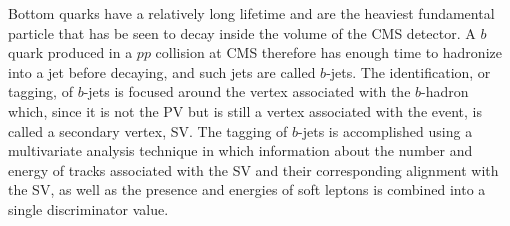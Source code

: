  Bottom quarks have a relatively long lifetime 
  and are the heaviest fundamental particle
  that has be seen to decay inside the volume of the CMS detector.
 A $b$ quark produced in a $pp$ collision at CMS 
  therefore has enough time to hadronize into a jet before
  decaying, and such jets are called $b$-jets.
 The identification, or tagging, of $b$-jets is focused around
  the vertex associated with the $b$-hadron which,
  since it is not the PV but is still a vertex associated
  with the event, is called a secondary vertex, SV. 
 The tagging of $b$-jets is accomplished using a multivariate
  analysis technique in which information about
  the number and energy of tracks associated
  with the SV and their corresponding alignment
  with the SV, as well as the presence and energies of
  soft leptons is combined into a single discriminator value.

  
 

